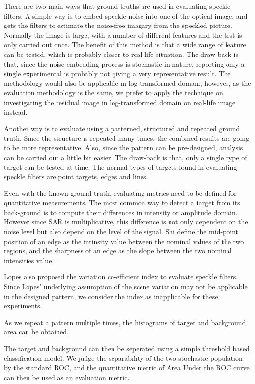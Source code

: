 There are two main ways that ground truths are used in evaluating speckle filters. 
A simple way is to embed speckle noise into one of the optical image, and gets the filters to estimate the noise-free imagary from the speckled picture.
Normally the image is large, with a number of different features and the test is only carried out once. 
The benefit of this method is that a wide range of feature can be tested, which is probably closer to real-life situation. 
The draw back is that, since the noise embedding process is stochastic in nature, reporting only a single experimental is probably not giving a very representative result.
The methodology would also be applicable in log-transformed domain, however, 
	as the evaluation methodology is the same, 
		we prefer to apply the technique on investigating the residual image in log-transformed domain on real-life image instead.

Another way is to evaluate using a patterned, structured and repeated ground truth.
Since the structure is repeated many times, the combined results are going to be more representative.
Also, since the pattern can be pre-designed, analysis can be carried out a little bit easier.
The draw-back is that, only a single type of target can be tested at time.
The normal types of targets found in evaluating speckle filters are point targets, edges and lines.

Even with the known ground-truth, evaluating metrics need to be defined for quantitative measurements.
The most common way to detect a target from its back-ground is to compute their differences in intensity or amplitude domain. 
However since SAR is multiplicative, this difference is not only dependent on the noise level but also depend on the level of the signal.
Shi define the mid-point position of an edge as the intinsity value between the nominal values of the two regions, 
	and the sharpness of an edge as the slope between the two nominal intensities value, . 

Lopes also proposed the variation co-efficient index  to evaluate speckle filters.
Since Lopes' underlying assumption of the scene variation may not be applicable in the designed pattern, 
	we consider the index as inapplicable for these experiments.


As we repeat a pattern multiple times,
	the histograms of target and background area can be obtained.

The target and background can then be seperated using a simple threshold based classification model.
We judge the separability of the two stochastic population by the standard ROC, and the quantitative metric of Area Under the ROC curve can then be used as an evaluation metric.

